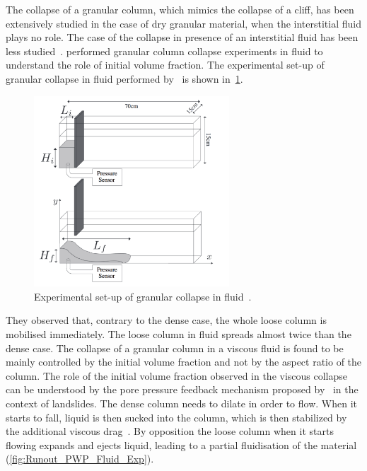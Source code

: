 The collapse of a granular column, which mimics the collapse of a cliff, has 
been extensively studied in the case of dry granular material, when the 
interstitial fluid plays no role. The case of the collapse in presence of an 
interstitial fluid has been less studied~\citep{Topin2012}. 
\citet{Rondon2011} performed granular column collapse experiments in fluid to 
understand the role of initial volume fraction. The experimental set-up 
of granular collapse in fluid performed by~\citet{Rondon2011} is shown 
in~\cref{fig:Fluid_Collapse}.

\begin{figure}[htbp]
\centering
\includegraphics[width=0.65\textwidth]{Fluid_Collapse}
\caption{Experimental set-up of granular collapse in fluid~\citep{Rondon2011}.}
\label{fig:Fluid_Collapse}
\end{figure}

They observed that, contrary to 
the dense case, the whole loose column is mobilised immediately. The loose 
column in fluid spreads almost twice than the dense case. The 
collapse of a granular column in a viscous fluid is found to be mainly 
controlled by the initial volume fraction and not by the aspect ratio of the 
column. The role of the initial volume fraction observed in the viscous 
collapse can be understood by the pore pressure feedback mechanism proposed 
by~\citep{Schaeffer2008,Iverson2000} in the context of landslides. The dense 
column needs to dilate in order to flow. When it starts to fall, liquid
is then sucked into the column, which is then stabilized by the additional 
viscous drag~\citep{Rondon2011,Topin2012}. By opposition the loose column when 
it starts flowing expands and ejects liquid, leading to a partial fluidisation 
of the material (\cref{fig:Runout_PWP_Fluid_Exp}). 

